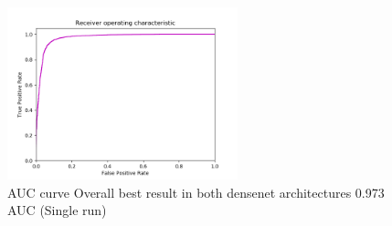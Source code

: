 \begin{figure}[ht]
\centering
\includegraphics[height= 5cm]{images/densenet/densenet_two_channel_ninetysevenAUC}
\caption{AUC curve Overall best result in both densenet architectures 0.973 AUC (Single run)}
\label{fig:densenet_two_channel_ninetysevenAUC}
\end{figure}
